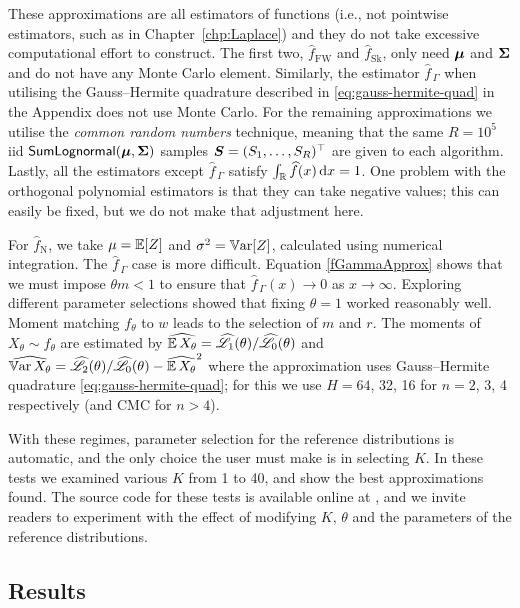 These approximations are all estimators of functions (i.e., not pointwise estimators, such as in Chapter~\ref{chp:Laplace}) and they do not take excessive computational effort to construct. The first two, $\widehat{f}_{\mathrm{FW}}$ and $\widehat{f}_{\mathrm{Sk}}$, only need $\bm{\mu}$ and $\bm{\Sigma}$ and do not have any Monte Carlo element. Similarly, the estimator $\widehat{f}_{\,\Gamma}$ when utilising the Gauss--Hermite quadrature described in \eqref{eq:gauss-hermite-quad}
in the Appendix does not use Monte Carlo. For the remaining approximations we utilise the \emph{common random numbers} technique, meaning that the same $R=10^5$ iid $\mathsf{SumLognormal}(\bm{\mu}, \bm{\Sigma})$ samples $\bm{S} = (S_1, \dots, S_R)^\top$ are given to each algorithm. Lastly, all the estimators except $\widehat{f}_{\,\Gamma}$ satisfy $\int_{\mathbb{R}} \widehat{f}(x) \mathop{}\!\mathrm{d} x = 1$. One problem with the orthogonal polynomial estimators is that they can take negative values; this can easily be fixed, but we do not make that adjustment here.

For $\widehat{f}_{\mathrm{N}}$, we take $\mu = \operatorname{{\mathbb E}}[Z]$ and $\sigma^2 = \operatorname{\mathbb{V}\mathrm{ar}}[Z]$, calculated using numerical integration.
The $\widehat{f}_{\,\Gamma}$ case is more difficult. Equation \eqref{fGammaApprox} shows that we must impose $\theta m < 1$ to ensure that $\widehat{f}_{\,\Gamma}(x)\to 0$ as $x\to \infty$.
Exploring different parameter selections showed that fixing $\theta = 1$ worked reasonably well. Moment matching $f_\theta$ to $w$ leads to the selection of $m$ and $r$. The moments of $X_\theta \sim f_\theta$ are estimated by
$ \widehat{\operatorname{{\mathbb E}} X_\theta} = \widehat{\mathscr{L}}_1(\theta) / \widehat{\mathscr{L}}_0(\theta)$  and
 $\widehat{\operatorname{\mathbb{V}\mathrm{ar}} X_\theta} = \widehat{\mathscr{L}}_2(\theta) / \widehat{\mathscr{L}}_0(\theta) - \widehat{\operatorname{{\mathbb E}} X_\theta}^2  $ where the approximation uses Gauss--Hermite quadrature \eqref{eq:gauss-hermite-quad}; for this we use $H = 64$, 32, 16 for $n=2$, 3, 4 respectively (and CMC for $n > 4$).

With these regimes, parameter selection for the reference distributions is automatic, and the only choice the user must make is in selecting $K$. In these tests we examined various $K$ from 1 to 40, and show the best approximations found.
The source code for these tests is available online at \cite{OrthogoCode}, and we invite readers to experiment with the effect of modifying $K$, $\theta$ and the parameters of the reference distributions.

\subsection{Results}

